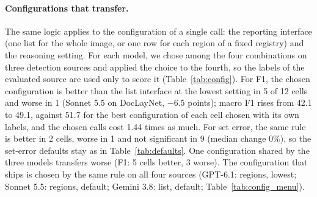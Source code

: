 

\paragraph{Configurations that transfer.} The same logic applies to the configuration of a single call: the reporting interface (one list for the whole image, or one row for each region of a fixed registry) and the reasoning setting. For each model, we chose among the four combinations on three detection sources and applied the choice to the fourth, so the labels of the evaluated source are used only to score it (Table~\ref{tab:config}). For F1, the chosen configuration is better than the list interface at the lowest setting in 5 of 12 cells and worse in 1 (Sonnet 5.5 on DocLayNet, $-6.5$ points); macro F1 rises from 42.1 to 49.1, against 51.7 for the best configuration of each cell chosen with its own labels, and the chosen calls cost 1.44 times as much. For set error, the same rule is better in 2 cells, worse in 1 and not significant in 9 (median change 0\%), so the set-error defaults stay as in Table~\ref{tab:defaults}. One configuration shared by the three models transfers worse (F1: 5 cells better, 3 worse). The configuration that ships is chosen by the same rule on all four sources (GPT-6.1: regions, lowest; Sonnet 5.5: regions, default; Gemini 3.8: list, default; Table~\ref{tab:config_menu}).

